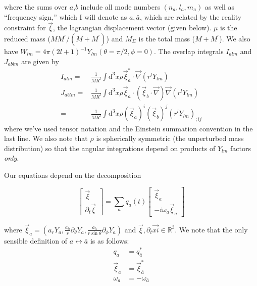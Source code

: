 where the sums over $a$,$b$ include all mode numbers $(n_a,l_a,m_a)$ as well as ``frequency sign,'' which I will denote as $a,\bar{a}$, which are related by the reality constraint for $\vec{\xi}$, the lagrangian displacement vector (given below). $\mu$ is the reduced mass ($M M^\prime/(M+M^\prime)$) and $M_{\Sigma}$ is the total mass ($M+M^\prime$). We also have $W_{lm} = 4\pi (2l+1)^{-1} Y_{lm}(\theta=\pi/2,\phi=0)$. The overlap integrals $I_{alm}$ and $J_{ablm}$ are given by
\begin{subequations}
\begin{align}
I_{alm}   = & \frac{1}{M R^l} \int \mathrm{d}^3 x \rho \vec{\xi}_a^\ast \cdot \vec{\nabla} \left(r^l Y_{lm}\right) \\
J_{ablm}  = & \frac{1}{M R^l} \int \mathrm{d}^3 x \rho \vec{\xi}_a \cdot \left(\vec{\xi}_b\cdot\vec{\nabla}\right) \vec{\nabla}\left(r^l Y_{lm} \right) \\
          = & \frac{1}{M R^l} \int \mathrm{d}^3 x \rho (\vec{\xi}_a)^i (\vec{\xi}_b)^j \left(r^l Y_{lm} \right)_{;ij}
\end{align}
\end{subequations}
where we've used tensor notation and the Einstein summation convention in the last line. We also note that $\rho$ is spherically symmetric (the unperturbed mass distribution) so that the angular integrations depend on products of $Y_{lm}$ factors \emph{only}.

Our equations depend on the decomposition

\begin{equation}
\begin{bmatrix} \vec{\xi} \\ \partial_t \vec{\xi} \end{bmatrix}
= 
\sum_{a} q_a(t) \begin{bmatrix} \vec{\xi}_a \\ -i\omega_a\vec{\xi}_a \end{bmatrix}
\end{equation}

where $\vec{\xi}_a = \left( a_r Y_a, \frac{a_h}{r} \partial_{\theta} Y_a, \frac{a_h}{r \sin\theta} \partial_{\phi} Y_a \right)$ and $\vec{\xi}, \partial_t \vec{xi} \in \mathbb{R}^3$. We note that the only sensible definition of $a \leftrightarrow \bar{a}$ is as follows:
\begin{subequations}
\begin{align}
q_a & =  q_{\bar{a}}^\ast \\
\vec{\xi}_a & =  \vec{\xi}_{\bar{a}}^\ast \\
\omega_a & =  -\omega_{\bar{a}}
\end{align}
\end{subequations}

